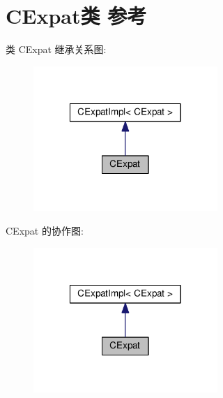 \hypertarget{class_c_expat}{\section{C\+Expat类 参考}
\label{class_c_expat}
}


类 C\+Expat 继承关系图\+:
\nopagebreak
\begin{figure}[H]
\begin{center}
\leavevmode
\includegraphics[width=198pt]{class_c_expat__inherit__graph}
\end{center}
\end{figure}


C\+Expat 的协作图\+:
\nopagebreak
\begin{figure}[H]
\begin{center}
\leavevmode
\includegraphics[width=198pt]{class_c_expat__coll__graph}
\end{center}
\end{figure}
